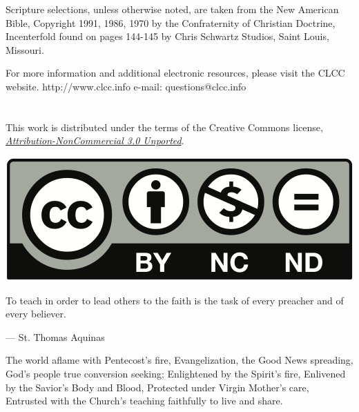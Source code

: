\documentclass[oneside]{book}
\begin{document}
Scripture selections, unless otherwise noted, are taken from the New American
Bible, Copyright 1991, 1986, 1970 by the Confraternity of Christian Doctrine,
Incenterfold found on pages 144-145 by Chris Schwartz Studios, Saint Louis,
Missouri.

For more information and additional electronic resources, please visit the CLCC
website.  http://www.clcc.info e-mail: questions@clcc.info

\section*{} 

\begin{center}

This work is distributed under the terms of the Creative Commons license,
\emph{\href{https://creativecommons.org/licenses/by-nc/3.0/us/legalcode}{
Attribution-NonCommercial 3.0 Unported}}.

\href{https://creativecommons.org/licenses/by-nc/3.0/us/}{
  \includegraphics[scale=0.4]{by-nc-nd}
}

\end{center}


To teach in order to lead others to the faith is the task of every preacher and
of every believer.

--- St. Thomas Aquinas


The world aflame with Pentecost's fire, Evangelization, the Good News spreading,
God's people true conversion seeking; Enlightened by the Spirit's fire,
Enlivened by the Savior's Body and Blood, Protected under Virgin Mother's care,
Entrusted with the Church's teaching faithfully to live and share.
\end{document}
